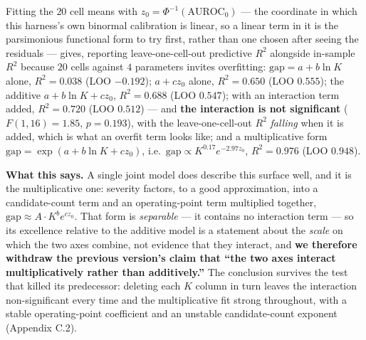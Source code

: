 \documentclass[10pt]{article} %
\begin{document}
Fitting the $20$ cell means with $z_0=\Phi^{-1}(\text{AUROC}_0)$ --- the
coordinate in which this harness's own binormal calibration is linear, so a
linear term in it is the parsimonious functional form to try first, rather
than one chosen after seeing the residuals ---
gives, reporting leave-one-cell-out predictive $R^2$ alongside in-sample
$R^2$ because $20$ cells against $4$ parameters invites overfitting:
$\text{gap}=a+b\ln K$ alone, $R^2=0.038$ (LOO $-0.192$); $a+cz_0$ alone,
$R^2=0.650$ (LOO $0.555$); the additive $a+b\ln K+cz_0$, $R^2=0.688$ (LOO
$0.547$); with an interaction term added, $R^2=0.720$ (LOO $0.512$) --- and
\textbf{the interaction is not significant} ($F(1,16)=1.85$, $p=0.193$),
with the leave-one-cell-out $R^2$ \emph{falling} when it is added, which is
what an overfit term looks like; and a multiplicative form
$\text{gap}=\exp(a+b\ln K+cz_0)$, i.e.\ $\text{gap}\propto
K^{0.17}e^{-2.97 z_0}$, $R^2=\mathbf{0.976}$ (LOO $\mathbf{0.948}$).

\textbf{What this says.} A single joint model does describe this surface well,
and it is the multiplicative one: severity factors, to a good approximation,
into a candidate-count term and an operating-point term multiplied together,
$\text{gap}\approx A\cdot K^{b}e^{cz_0}$. That form is \emph{separable} --- it
contains no interaction term --- so its excellence relative to the additive
model is a statement about the \emph{scale} on which the two axes combine, not
evidence that they interact, and \textbf{we therefore withdraw the previous
version's claim that ``the two axes interact multiplicatively rather than
additively.''} The conclusion survives the test that killed its predecessor:
deleting each $K$ column in turn leaves the interaction non-significant every
time and the multiplicative fit strong throughout, with a stable
operating-point coefficient and an unstable candidate-count exponent
(Appendix C.2).
\end{document}
